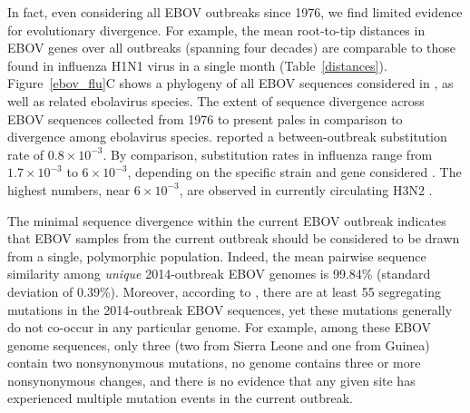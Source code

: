 \documentclass[11pt]{article}
\begin{document}
In fact, even considering all EBOV outbreaks since 1976, we find limited evidence for evolutionary divergence. For example, the mean root-to-tip distances in EBOV genes over all outbreaks (spanning four decades) are comparable to those found in influenza H1N1 virus in a single month (Table~\ref{distances}). Figure~\ref{ebov_flu}C shows a phylogeny of all EBOV sequences considered in \citet{Gire2014}, as well as related ebolavirus species. The extent of sequence divergence across EBOV sequences collected from 1976 to present pales in comparison to divergence among ebolavirus species. \citet{Gire2014} reported a between-outbreak substitution rate of $0.8\times10^{-3}$. By comparison, substitution rates in influenza range from $1.7\times10^{-3}$ to $6\times10^{-3}$, depending on the specific strain and gene considered \citep{Rambautetal2008,Smithetal2009,Bedfordetal2010,Quetal2011,Rocheetal2014}. The highest numbers, near $6\times10^{-3}$, are observed in currently circulating H3N2 \citep{Rambautetal2008,Bedfordetal2010}.

The minimal sequence divergence within the current EBOV outbreak indicates that EBOV samples from the current outbreak should be considered to be drawn from a single, polymorphic population. Indeed, the mean pairwise sequence similarity among \emph{unique} 2014-outbreak EBOV genomes is 99.84\% (standard deviation of 0.39\%). Moreover, according to \citet{Gire2014}, there are at least 55 segregating mutations in the 2014-outbreak EBOV sequences, yet these mutations generally do not co-occur in any particular genome. For example, among these EBOV genome sequences, only three (two from Sierra Leone and one from Guinea) contain two nonsynonymous mutations, no genome contains three or more nonsynonymous changes, and there is no evidence that any given site has experienced multiple mutation events in the current outbreak.  
\end{document}
